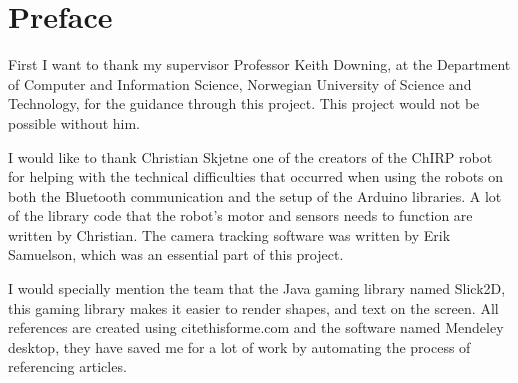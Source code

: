 \clearpage

\section*{Preface}



\vspace{1cm}

First I want to thank my supervisor Professor Keith Downing, at the Department of Computer and Information Science, Norwegian University of Science and Technology, for the guidance through this project. This project would not be possible without him.

I would like to thank Christian Skjetne one of the creators of the ChIRP robot for helping with the technical difficulties that occurred when using the robots on both the Bluetooth communication and the setup of the Arduino libraries. A lot of the library code that the robot's motor and sensors needs to function are written by Christian. The camera tracking software was written by Erik Samuelson, which was an essential part of this project.

I would specially mention the team that the Java gaming library named Slick2D, this gaming library makes it easier to render shapes, and text on the screen.
All references are created using citethisforme.com and the software named Mendeley desktop, they have saved me for a lot of work by automating the process of referencing articles.
